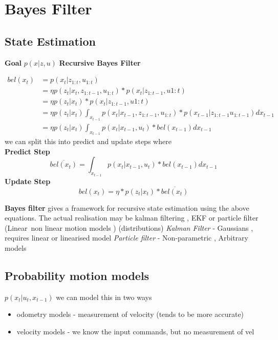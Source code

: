 \documentclass{article}
\begin{document}
\section{Bayes Filter}
\subsection{State Estimation}
    \textbf{Goal} $p(x|z,u)$
    \newline
    \textbf{Recursive Bayes Filter} 

\begin{align*}  
    bel(x_t) & = p(x_t | z_{1:t},u_{1:t})\\
    & = \eta p(z_t|x_t,z_{1:t-1},u_{1:t}) * p(x_t | z_{1:t-1},u{1:t})\\
    & = \eta p(z_t|x_t) * p(x_t | z_{1:t-1},u{1:t})\\
    & = \eta p(z_t|x_t) \int_{x_{t-1}} p(x_t |x_{t-1}, z_{1:t-1},u_{1:t}) * p(x_{t-1}|z_{1:t-1}u_{1:t-1})dx_{t-1}\\
    & = \eta p(z_t|x_t) \int_{x_{t-1}} p(x_t |x_{t-1},u_t) * bel(x_{t-1})dx_{t-1}
 \end{align*}
 we can split this into predict and update steps where\\
 \textbf{Predict Step} 
 $$\overline{bel(x_t)} =  \int_{x_{t-1}} p(x_t |x_{t-1},u_t) * bel(x_{t-1})dx_{t-1}$$
 \textbf{Update Step} 
 $$bel(x_t) =  \eta * p(z_t | x_t) * \overline{bel(x_t)}$$


 \textbf{Bayes filter} gives a framework for recursive state estimation using
 the above equations. The actual realisation  may be kalman filtering , EKF or
 particle filter
 (Linear\ non linear motion models )
 (distributions)
 \textit{Kalman Filter} -  Gaussians , requires linear or linearised model 
 \textit{Particle filter} - Non-parametric , Arbitrary models
 
 \subsection{Probability motion models}
 $p(x_t | u_t,x_{t-1})$ we can model this in two ways 
 \begin{itemize}
     \item odometry models - measurement of velocity (tends to be more accurate)
     \item velocity models - we know the input commands, but no measurement of vel
 \end{itemize}
\end{document}
